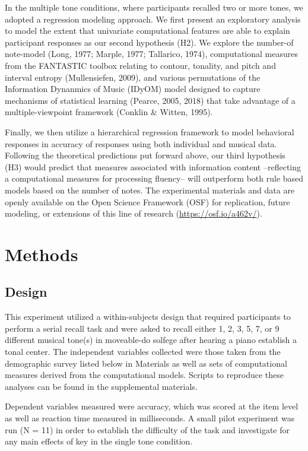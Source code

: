 \documentclass[english,man,floatsintext]{apa6}
\begin{document}
In the multiple tone conditions, where participants recalled two or more tones, we adopted a regression modeling approach.
We first present an exploratory analysis to model the extent that univariate computational features are able to explain participant responses as our second hypothesis (H2).
We explore the number-of note-model (Long, 1977; Marple, 1977; Tallarico, 1974), computational measures from the FANTASTIC toolbox relating to contour, tonality, and pitch and interval entropy (Mullensiefen, 2009), and various permutations of the Information Dynanmics of Music (IDyOM) model designed to capture mechanisms of statistical learning (Pearce, 2005, 2018) that take advantage of a multiple-viewpoint framework (Conklin \& Witten, 1995).

Finally, we then utilize a hierarchical regression framework to model behavioral responses in accuracy of responses using both individual and musical data.\\
Following the theoretical predictions put forward above, our third hypothesis (H3) would predict that measures associated with information content --reflecting a computational measures for processing fluency-- will outperform both rule based models based on the number of notes.
The experimental materials and data are openly available on the Open Science Framework (OSF) for replication, future modeling, or extensions of this line of research (\url{https://osf.io/a462v/}).

\hypertarget{methods}{%
\section{Methods}\label{methods}}

\hypertarget{design}{%
\subsection{Design}\label{design}}

This experiment utilized a within-subjects design that required participants to perform a serial recall task and were asked to recall either 1, 2, 3, 5, 7, or 9 different musical tone(s) in moveable-do solfege after hearing a piano establish a tonal center.
The independent variables collected were those taken from the demographic survey listed below in Materials as well as sets of computational measures derived from the computational models.
Scripts to reproduce these analyses can be found in the supplemental materials.

Dependent variables measured were accuracy, which was scored at the item level as well as reaction time measured in milliseconds.
A small pilot experiment was run (N = 11) in order to establish the difficulty of the task and investigate for any main effects of key in the single tone condition.
\end{document}
